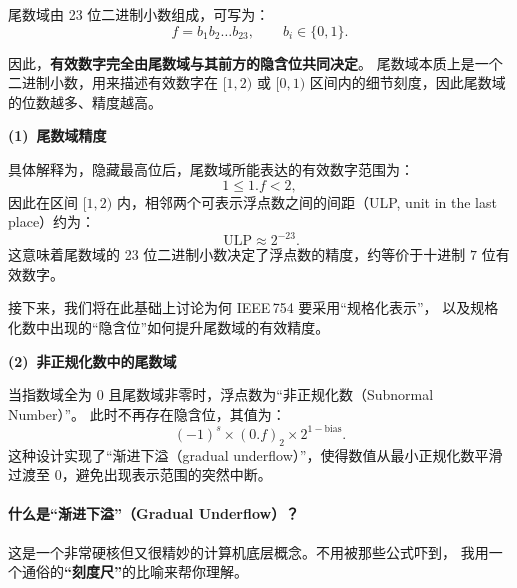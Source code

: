 尾数域由 23 位二进制小数组成，可写为：
\[
f = b_1 b_2 \ldots b_{23}, \qquad b_i\in\{0,1\}.
\]


因此，\textbf{有效数字完全由尾数域与其前方的隐含位共同决定}。
尾数域本质上是一个二进制小数，用来描述有效数字在 $[1,2)$ 或 
$[0,1)$ 区间内的细节刻度，因此尾数域的位数越多、精度越高。

\vspace{1em}
\noindent\textbf{(1)~尾数域精度}\par\vspace{0.5em}

具体解释为，隐藏最高位后，尾数域所能表达的有效数字范围为：
\[
1 \le 1.f < 2,
\]
因此在区间 $[1,2)$ 内，相邻两个可表示浮点数之间的间距（ULP, unit in the last place）约为：
\[\
\mathrm{ULP} \approx 2^{-23}.
\]
这意味着尾数域的 23 位二进制小数决定了浮点数的精度，约等价于十进制 $7$ 位有效数字。






接下来，我们将在此基础上讨论为何 IEEE\,754 要采用“规格化表示”，
以及规格化数中出现的“隐含位”如何提升尾数域的有效精度。

\newpage





\vspace{1em}
\noindent\textbf{(2)~非正规化数中的尾数域}\par\vspace{0.5em}

当指数域全为 $0$ 且尾数域非零时，浮点数为“非正规化数（Subnormal Number）”。
此时不再存在隐含位，其值为：
\[
(-1)^s \times (0.f)_2 \times 2^{1-\mathrm{bias}}.
\]
这种设计实现了“渐进下溢（gradual underflow）”，使得数值从最小正规化数平滑过渡至 $0$，避免出现表示范围的突然中断。





\paragraph{什么是“渐进下溢”（Gradual Underflow）？}

这是一个非常硬核但又很精妙的计算机底层概念。不用被那些公式吓到，
我用一个通俗的\textbf{“刻度尺”}的比喻来帮你理解。


